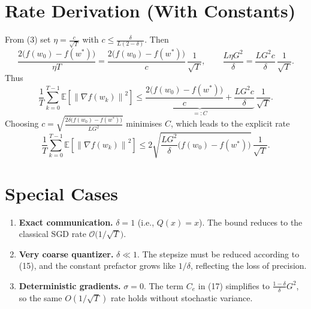 \documentclass{article}
\newcommand{\E}{\mathbb{E}}
\newcommand{\norm}[1]{\left\|#1\right\|}
\begin{document}
\section*{Rate Derivation (With Constants)}
From (3) set $\eta = \frac{c}{\sqrt{T}}$ with
$c\le \frac{\delta}{L(2-\delta)}$. Then
\[
\frac{2\big(f(w_0)-f(w^{*})\big)}{\eta T}
   =\frac{2\big(f(w_0)-f(w^{*})\big)}{c}\,\frac{1}{\sqrt{T}},
\qquad
\frac{L\eta G^{2}}{\delta}
   =\frac{L G^{2}c}{\delta}\,\frac{1}{\sqrt{T}} .
\]
Thus
\[
\frac{1}{T}\sum_{k=0}^{T-1}\E[\norm{\nabla f(w_k)}^{2}]
\le
\underbrace{\frac{2\big(f(w_0)-f(w^{*})\big)}{c}
           +\frac{L G^{2}c}{\delta}}_{=:C}\,
\frac{1}{\sqrt{T}} .
\]
Choosing $c=\sqrt{\frac{2\delta\big(f(w_0)-f(w^{*})\big)}{L G^{2}}}$ minimises $C$,
which leads to the explicit rate
\[
\frac{1}{T}\sum_{k=0}^{T-1}\E[\norm{\nabla f(w_k)}^{2}]
\le
2\sqrt{\frac{L G^{2}}{\delta}\big(f(w_0)-f(w^{*})\big)}\,
\frac{1}{\sqrt{T}} .
\]

\section*{Special Cases}
\begin{enumerate}
\item \textbf{Exact communication.} $\delta=1$ (i.e., $Q(x)=x$). The bound
reduces to the classical SGD rate
$\mathcal{O}\big(1/\sqrt{T}\big)$.
\item \textbf{Very coarse quantizer.} $\delta\ll1$.
The stepsize must be reduced according to (15), and the constant
prefactor grows like $1/\delta$, reflecting the loss of precision.
\item \textbf{Deterministic gradients.} $\sigma=0$.
The term $C_{e}$ in (17) simplifies to $\frac{1-\delta}{\delta}G^{2}$,
so the same $O(1/\sqrt{T})$ rate holds without stochastic variance.
\end{enumerate}
\end{document}
